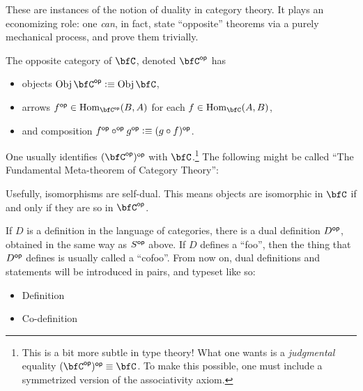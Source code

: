 \documentclass[a5paper]{article}
\newcommand{\dual}[2]{
  \begin{itemize}\renewcommand{\labelitemi}{$\circ $}
    \itemsep0em
    \item #1
    \item #2
   \end{itemize}
}
\begin{document}
These are instances of the notion of duality in category theory. It plays an
economizing role: one \textit{can}, in fact, state ``opposite'' theorems via a
purely mechanical process, and prove them trivially.

\begin{definition}
  The opposite category of $\bfC$, denoted $\bfC^\op$ has
  \begin{itemize}
    \itemsep0em
    \item objects $\Obj\bfC^\op\defeq \Obj\bfC$,
    \item arrows $f^\op \in \Hom_{\bfC^{\op}}(B,A)$ for each $f\in\Hom_{\bfC}(A,B)$,
    \item and composition $f^{\mathsf{op}}\circ ^{\mathsf{op}} g^{\mathsf{op}}\vcentcolon\equiv (g\circ f)^{\mathsf{op}}$.
  \end{itemize}
\end{definition}

One usually identifies $(\bfC^\op)^\op$ with $\bfC$.\footnote{This is a bit more
  subtle in type theory! What one wants is a \textit{judgmental} equality
  $(\bfC^\op)^\op\jdeq \bfC$. To make this possible, one must include a
  symmetrized version of the associativity axiom.}
The following might be called ``The Fundamental Meta-theorem of Category Theory'':


Usefully, isomorphisms are self-dual. This means objects are isomorphic in
$\bfC$ if and only if they are so in $\bfC^\op$.

If $D$ is a definition in the language of categories, there is a dual
definition $D^{\mathsf{op}}$, obtained in the same way as $S^{\mathsf{op}}$ above. If $D$ defines a
``foo'', then the thing that $D^{\mathsf{op}}$ defines is usually called a ``cofoo''.
From now on, dual definitions and statements will be introduced in pairs, and
typeset like so:

\dual{
  Definition
}{
  Co-definition
}
\end{document}
